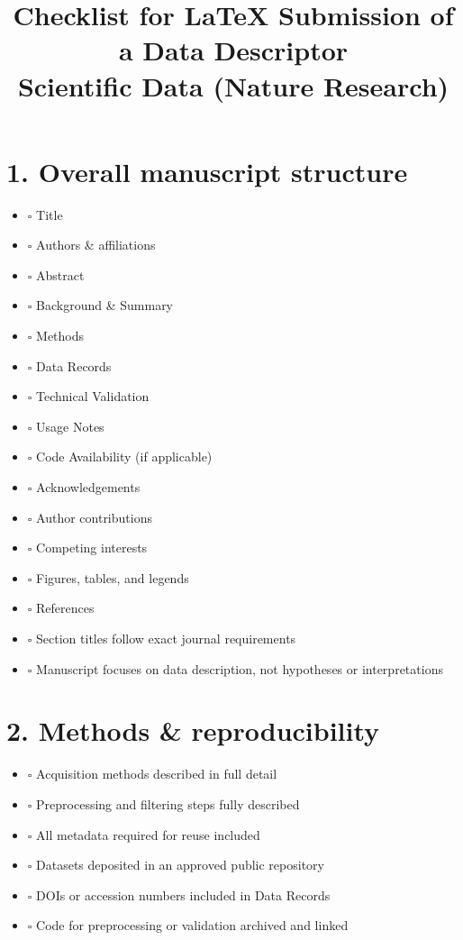 \documentclass[11pt]{article}
\title{Checklist for LaTeX Submission of a Data Descriptor\\\large Scientific Data (Nature Research)}
\date{}
\newcommand{\cbox}{$\square$ }
\begin{document}
\maketitle

\section*{1. Overall manuscript structure}

\begin{itemize}[leftmargin=1.2cm]
    \item \cbox Title
    \item \cbox Authors \& affiliations
    \item \cbox Abstract
    \item \cbox Background \& Summary
    \item \cbox Methods
    \item \cbox Data Records
    \item \cbox Technical Validation
    \item \cbox Usage Notes
    \item \cbox Code Availability (if applicable)
    \item \cbox Acknowledgements
    \item \cbox Author contributions
    \item \cbox Competing interests
    \item \cbox Figures, tables, and legends
    \item \cbox References
    \item \cbox Section titles follow exact journal requirements
    \item \cbox Manuscript focuses on data description, not hypotheses or interpretations
\end{itemize}

\section*{2. Methods \& reproducibility}

\begin{itemize}[leftmargin=1.2cm]
    \item \cbox Acquisition methods described in full detail
    \item \cbox Preprocessing and filtering steps fully described
    \item \cbox All metadata required for reuse included
    \item \cbox Datasets deposited in an approved public repository
    \item \cbox DOIs or accession numbers included in Data Records
    \item \cbox Code for preprocessing or validation archived and linked
\end{itemize}
\end{document}
